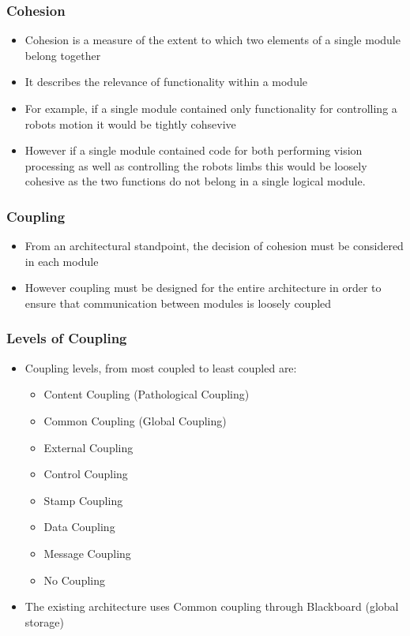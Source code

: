 \documentclass{beamer}
\begin{document}
\begin{frame}
	\frametitle{Cohesion}
	\begin{itemize}
		\item Cohesion is a measure of the extent to which two elements of a single module belong together
		\item It describes the relevance of functionality within a module
		\item For example, if a single module contained only functionality for controlling a robots motion it would be tightly cohsevive
		\item However if a single module contained code for both performing vision processing as well as controlling the robots limbs this would be loosely cohesive as the two functions do not belong in a single logical module.
	\end{itemize}
\end{frame}

\begin{frame}
	\frametitle{Coupling}
	\begin{itemize}
		\item From an architectural standpoint, the decision of cohesion must be considered in each module
		\item However coupling must be designed for the entire architecture in order to ensure that communication between modules is loosely coupled
	\end{itemize}
\end{frame}

\begin{frame}
	\frametitle{Levels of Coupling}
	\begin{itemize}
		\item Coupling levels, from most coupled to least coupled are:
		\begin{itemize}
			\item Content Coupling (Pathological Coupling)
			\item Common Coupling (Global Coupling)
			\item External Coupling
			\item Control Coupling
			\item Stamp Coupling
			\item Data Coupling
			\item Message Coupling
			\item No Coupling
		\end{itemize}
		\item The existing architecture uses Common coupling through Blackboard (global storage)
	\end{itemize}
\end{frame}
\end{document}
